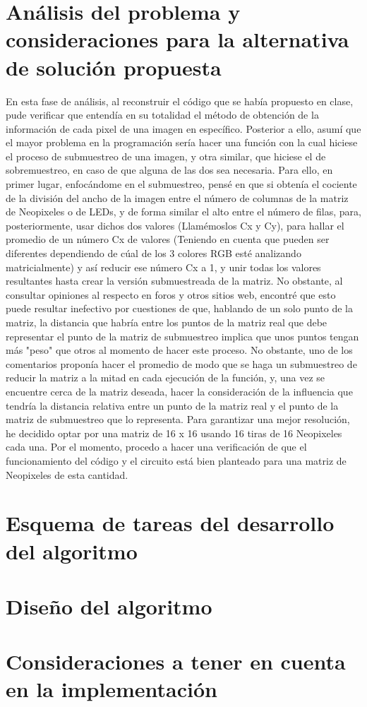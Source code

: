 \documentclass{article}
\begin{document}
 \section{Análisis del problema y consideraciones para la alternativa de solución propuesta}
 En esta fase de análisis, al reconstruir el código que se había propuesto en clase, pude verificar que entendía en su totalidad el método de obtención de la información de cada pixel de una imagen en específico. Posterior a ello, asumí que el mayor problema en la programación sería hacer una función con la cual hiciese el proceso de submuestreo de una imagen, y otra similar, que hiciese el de sobremuestreo, en caso de que alguna de las dos sea necesaria. Para ello, en primer lugar, enfocándome en el submuestreo, pensé en que si obtenía el cociente de la división del ancho de la imagen entre el número de columnas de la matriz de Neopixeles o de LEDs, y de forma similar el alto entre el número de filas, para, posteriormente, usar dichos dos valores (Llamémoslos Cx y Cy), para hallar el promedio de un número Cx de valores (Teniendo en cuenta que pueden ser diferentes dependiendo de cúal de los 3 colores RGB esté analizando matricialmente) y así reducir ese número Cx a 1, y unir todas los valores resultantes hasta crear la versión submuestreada de la matriz. No obstante, al consultar opiniones al respecto en foros y otros sitios web, encontré que esto puede resultar inefectivo por cuestiones de que, hablando de un solo punto de la matriz, la distancia que habría entre los puntos de la matriz real que debe representar el punto de la matriz de submuestreo implica que unos puntos tengan más "peso" que otros al momento de hacer este proceso. No obstante, uno de los comentarios proponía hacer el promedio de modo que se haga un submuestreo de reducir la matriz a la mitad en cada ejecución de la función, y, una vez se encuentre cerca de la matriz deseada, hacer la consideración de la influencia que tendría la distancia relativa entre un punto de la matriz real y el punto de la matriz de submuestreo que lo representa. Para garantizar una mejor resolución, he decidido optar por una matriz de 16 x 16 usando 16 tiras de 16 Neopixeles cada una. Por el momento, procedo a hacer una verificación de que el funcionamiento del código y el circuito está bien planteado para una matriz de Neopixeles de esta cantidad.
 \section{Esquema de tareas del desarrollo del algoritmo}
 \section{Diseño del algoritmo}
 \section{Consideraciones a tener en cuenta en la implementación}


\end{document}

